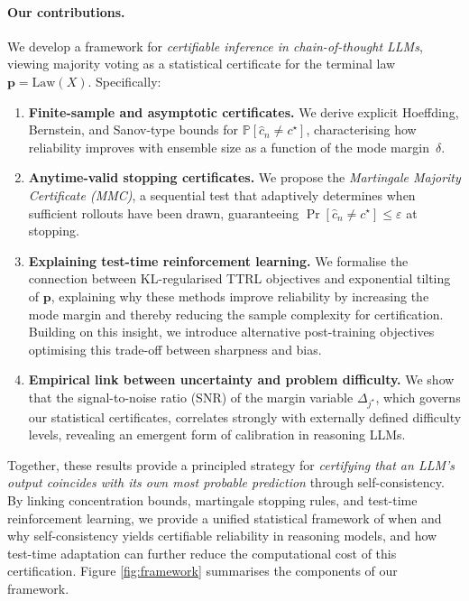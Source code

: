 \documentclass{article} %
\begin{document}
\paragraph{Our contributions.}
We develop a framework for \emph{certifiable inference in chain-of-thought LLMs}, viewing majority voting as a statistical certificate for the terminal law $\mathbf p=\mathrm{Law}(X)$. 
Specifically:
\begin{enumerate}
\item \textbf{Finite-sample and asymptotic certificates.}
We derive explicit Hoeffding, Bernstein, and Sanov-type bounds for $\mathbb{P}[\widehat{c}_n \neq c^\star]$, characterising how reliability improves with ensemble size as a function of the mode margin~$\delta$.
\item \textbf{Anytime-valid stopping certificates.}
We propose the \emph{Martingale Majority Certificate (MMC)}, a sequential test that adaptively determines when sufficient rollouts have been drawn, guaranteeing $\Pr[\widehat{c}_n \neq c^\star]\le \varepsilon$ at stopping.
\item \textbf{Explaining test-time reinforcement learning.}
We formalise the connection between KL-regularised TTRL objectives and exponential tilting of $\mathbf p$, explaining why these methods improve reliability by increasing the mode margin and thereby reducing the sample complexity for certification. 
Building on this insight, we introduce alternative post-training objectives optimising this trade-off between sharpness and bias.
\item \textbf{Empirical link between uncertainty and problem difficulty.}
We show that the signal-to-noise ratio (SNR) of the margin variable $\Delta_{j^\star}$, which governs our statistical  certificates, correlates strongly with externally defined difficulty levels,
revealing an emergent form of calibration in reasoning LLMs.
\end{enumerate}

Together, these results provide a principled strategy for \emph{certifying that an LLM’s output coincides with its own most probable prediction} through self-consistency.  By linking concentration bounds, martingale stopping rules, and test-time reinforcement learning, we provide a unified statistical framework of when and why self-consistency yields certifiable reliability in reasoning models, and how test-time adaptation can further reduce the computational cost of this certification. Figure \ref{fig:framework} summarises the components of our framework.
\end{document}
